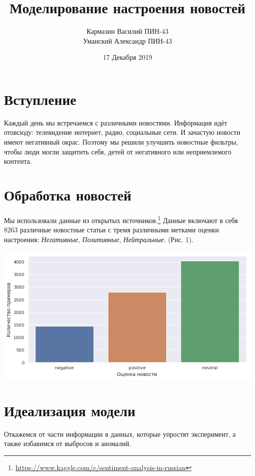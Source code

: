 \documentclass[12pt]{article}
\title{\textbf{Моделирование настроения новостей}}
\date{17 Декабря 2019}
\author{Кармазин Василий ПИН-43\\ Уманский Александр ПИН-43}
\begin{document}
    \maketitle

    \section{Вступление}
        Каждый день мы встречаемся с различными новостями. Информация идёт отовсюду: телевидение
        интернет, радио, социальные сети. И зачастую новости имеют негативный окрас.
        Поэтому мы решили улучшить новостные фильтры, чтобы люди могли защитить себя,
        детей от негативного или неприемлемого контента.

    \section{Обработка новостей}
        Мы использовали данные из открытых источников.\footnote{\href{https://www.kaggle.com/c/sentiment-analysis-in-russian}{https://www.kaggle.com/c/sentiment-analysis-in-russian}}
        Данные включают в себя 8263 различные новостные статьи с тремя различными метками оценки настроения: 
        \textit{Негативные}, \textit{Позитивные}, \textit{Нейтральные}. (Рис. 1).

        \begin{center}
            \includegraphics[scale=0.5]{sent_dist}
        \end{center}

        
    \section{Идеализация модели}
        Откажемся от части информации в данных, которые упростят эксперимент, а также избавимся 
        от выбросов и аномалий. 
        
\end{document}
